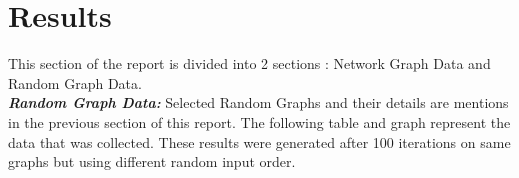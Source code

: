 \documentclass{article}
\begin{document}

\section{Results}

\bigbreak
This section of the report is divided into 2 sections : Network Graph Data and Random Graph Data. \\

\textbf{\textit{Random Graph Data:}}
Selected Random Graphs and their details are mentions in the previous section of this report. The following table and graph represent the data 
that was collected. These results were generated after 100 iterations on same graphs but using different random input order.
\end{document}
